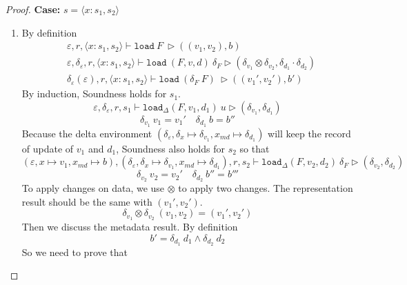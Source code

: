 \documentclass[10pt,twoside,a4paper]{article}
\theoremstyle{theorem}
\theoremstyle{lemma}
\theoremstyle{property}
\theoremstyle{definition}
\theoremstyle{assumption}
\begin{document}
\begin{proof}
	\textbf{Case: } $s = \langle x : s_1, s_2 \rangle$\\
	\begin{enumerate}	
	\item
	By definition
	\begin{align*}
			& \varepsilon, r, \langle x : s_1, s_2 \rangle \vdash \mathtt{load}~ F~ \rhd ((v_1, v_2), b)\\
			& \varepsilon, \delta_\varepsilon, r, \langle x : s_1, s_2 \rangle \vdash \mathtt{load}~ (F,v,d)~ \delta_F \rhd (\delta_{v_1} \otimes \delta_{v_2},\delta_{d_1} \cdot \delta_{d_2})\\
			& \delta_\varepsilon(\varepsilon), r, \langle x : s_1, s_2 \rangle \vdash \mathtt{load}~ (\delta_F~F)~ \rhd ((v_1', v_2'), b')
	\end{align*}
	By induction, Soundness holds for $s_1$.
	\begin{displaymath}
		\varepsilon, \delta_\varepsilon, r, s_1 \vdash \mathtt{load}_\Delta (F,v_1,d_1)~ u \rhd (\delta_{v_1},\delta_{d_1})
	\end{displaymath}
	\begin{displaymath}
		\delta_{v_1} ~v_1 = v_1' \quad \delta_{d_1} ~b = b''
	\end{displaymath}
	Because the delta environment $(\delta_\varepsilon, \delta_x \mapsto \delta_{v_1}, x_{md} \mapsto \delta_{d_1})$ will keep the record of update of $v_1$ and $d_1$, Soundness also holds for $s_2$ so that
	\begin{displaymath}
		(\varepsilon, x \mapsto v_1, x_{md} \mapsto b), (\delta_\varepsilon, \delta_x \mapsto \delta_{v_1}, x_{md} \mapsto \delta_{d_1}), r, s_2 \vdash \mathtt{load}_\Delta (F,v_2,d_2)~ \delta_F \rhd (\delta_{v_2},\delta_{d_2})
	\end{displaymath}
	\begin{displaymath}
		\delta_{v_2} ~v_2 = v_2' \quad \delta_{d_2} ~b'' = b'''
	\end{displaymath}
	To apply changes on data, we use $\otimes$ to apply two changes. The representation result should be the same with $(v_1', v_2')$.
	\begin{displaymath}
		\delta_{v_1} \otimes \delta_{v_2} ~(v_1, v_2) = (v_1', v_2')
	\end{displaymath}
	Then we discuss the metadata result. By definition
	\begin{displaymath}
		b' = \delta_{d_1} ~d_1 \land \delta_{d_2} ~d_2
	\end{displaymath}
	So we need to prove that
	\begin{displaymath}

\end{displaymath}
\end{enumerate}
\end{proof}
\end{document}
